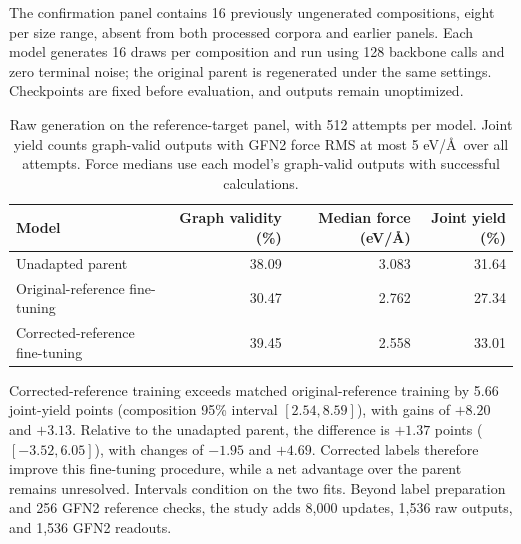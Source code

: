 The confirmation panel contains 16 previously ungenerated compositions, eight per size range, absent from both processed corpora and earlier panels. Each model generates 16 draws per composition and run using 128 backbone calls and zero terminal noise; the original parent is regenerated under the same settings. Checkpoints are fixed before evaluation, and outputs remain unoptimized.

\begin{table}[htbp]
\centering
\caption{Raw generation on the reference-target panel, with 512 attempts per model. Joint yield counts graph-valid outputs with GFN2 force RMS at most 5 eV/\AA\ over all attempts. Force medians use each model's graph-valid outputs with successful calculations.}
\small
\begin{tabular}{lrrr}
\toprule
Model & Graph validity (\%) & Median force (eV/\AA) & Joint yield (\%)\\
\midrule
Unadapted parent &38.09&3.083&31.64\\
Original-reference fine-tuning &30.47&2.762&27.34\\
Corrected-reference fine-tuning &39.45&2.558&33.01\\
\bottomrule
\end{tabular}
\end{table}

Corrected-reference training exceeds matched original-reference training by 5.66 joint-yield points (composition 95\% interval $[2.54,8.59]$), with gains of $+8.20$ and $+3.13$. Relative to the unadapted parent, the difference is $+1.37$ points ($[-3.52,6.05]$), with changes of $-1.95$ and $+4.69$. Corrected labels therefore improve this fine-tuning procedure, while a net advantage over the parent remains unresolved. Intervals condition on the two fits. Beyond label preparation and 256 GFN2 reference checks, the study adds 8,000 updates, 1,536 raw outputs, and 1,536 GFN2 readouts.
